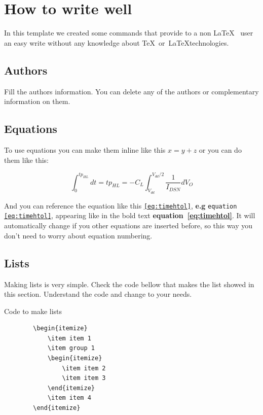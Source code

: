 \section{How to write well}
In this template we created some commands that provide to a non \LaTeX~ user an easy write without any knowledge about \TeX~or~\LaTeX technologies.

\subsection{Authors}

Fill the authors information. You can delete any of the authors or complementary information on them.

\subsection{Equations}

To use equations you can make them inline like this $x = y + z$ or you can do them like this:

\begin{equation}\label{eq:timehtol}
    \int_{0}^{tp_{HL}}dt = tp_{HL} = -C_L \int_{V_{dd}}^{V_{dd}/2}\frac{1}{I_{DSN}} dV_O
\end{equation}

And you can reference the equation like this \texttt{\ref{eq:timehtol}}, \textbf{e.g} \texttt{equation \ref{eq:timehtol}}, appearing like in the bold text \textbf{equation~\ref{eq:timehtol}}. It will automatically change if you other equations are inserted before, so this way you don't need to worry about equation numbering.

\subsection{Lists}

Making lists is very simple. Check the code bellow that makes the list showed in this section. Understand the code and change to your needs.

\begin{codebox}{Code to make lists}
    \begin{verbatim}
        \begin{itemize}
            \item item 1
            \item group 1
            \begin{itemize}
                \item item 2
                \item item 3
            \end{itemize}
            \item item 4
        \end{itemize}
    \end{verbatim}
\end{codebox}

